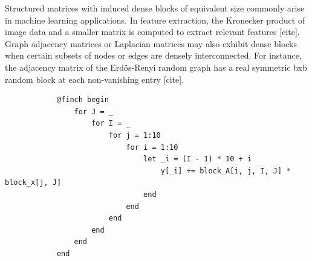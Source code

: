 Structured matrices with induced dense blocks of equivalent size commonly arise in machine learning applications. In feature extraction, the Kronecker product of image data and a smaller matrix is computed to extract relevant features [cite]. Graph adjacency matrices or Laplacian matrices may also exhibit dense blocks when certain subsets of nodes or edges are densely interconnected. For instance, the adjacency matrix of the Erdös-Renyi random graph has a real symmetric bxb random block at each non-vanishing entry [cite]. 

\begin{verbatim}
            @finch begin
                for J = _
                    for I = _
                        for j = 1:10
                            for i = 1:10
                                let _i = (I - 1) * 10 + i
                                    y[_i] += block_A[i, j, I, J] * block_x[j, J]
                                end
                            end
                        end
                    end
                end
            end
\end{verbatim}


